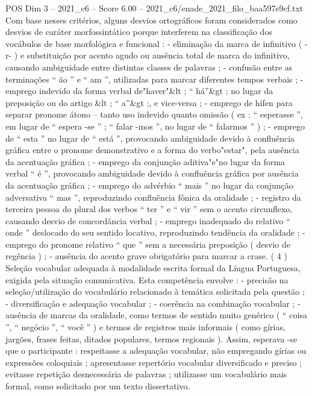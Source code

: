 \begin{textsample}{POS Dim 3 – 2021\_c6 – Score 6.00 – 2021\_c6/enade\_2021\_filo\_baa597e9cf.txt}
Com base nesses critérios, alguns desvios ortográficos foram considerados como desvios de caráter morfossintático porque interferem na classificação dos vocábulos de base morfológica e funcional : - eliminação da marca de infinitivo ( -r- ) e substituição por acento agudo ou ausência total de marca do infinitivo, causando ambiguidade entre distintas classes de palavras ; - confusão entre as terminações “ ão ” e “ am ”, utilizadas para marcar diferentes tempos verbais ; - emprego indevido da forma verbal de"haver"\&lt ; “ há”\&gt ; no lugar da preposição ou do artigo \&lt ; “ a”\&gt ;, e vice-versa ; - emprego de hífen para separar pronome átono – tanto uso indevido quanto omissão ( ex : “ esperasse ”, em lugar de “ espera -se ” ; “ falar -mos ”, no lugar de “ falarmos ” ) ; - emprego de “ esta ” no lugar de “ está ”, provocando ambiguidade devido à confluência gráfica entre o pronome demonstrativo e a forma do verbo"estar", pela ausência da acentuação gráfica ; - emprego da conjunção aditiva"e"no lugar da forma verbal “ é ”, provocando ambiguidade devido à confluência gráfica por ausência da acentuação gráfica ; - emprego do advérbio “ mais ” no lugar da conjunção adversativa “ mas ”, reproduzindo confluência fônica da oralidade ; - registro da terceira pessoa do plural dos verbos “ ter ” e “ vir ” sem o acento circunflexo, causando desvio de concordância verbal ; - emprego inadequado do relativo “ onde ” deslocado do seu sentido locativo, reproduzindo tendência da oralidade ; - emprego do pronome relativo “ que ” sem a necessária preposição ( desvio de regência ) ; - ausência do acento grave obrigatório para marcar a crase. ( 4 ) Seleção vocabular adequada à modalidade escrita formal da Língua Portuguesa, exigida pela situação comunicativa.
Esta competência envolve : - precisão na seleção/utilização do vocabulário relacionado à temática solicitada pela questão ; - diversificação e adequação vocabular ; - coerência na combinação vocabular ; - ausência de marcas da oralidade, como termos de sentido muito genérico ( “ coisa ”, “ negócio ”, “ você ” ) e termos de registros mais informais ( como gírias, jargões, frases feitas, ditados populares, termos regionais ).
Assim, esperava -se que o participante : respeitasse a adequação vocabular, não empregando gírias ou expressões coloquiais ; apresentasse repertório vocabular diversificado e preciso ; evitasse repetição desnecessária de palavras ; utilizasse um vocabulário mais formal, como solicitado por um texto dissertativo.

\end{textsample}
